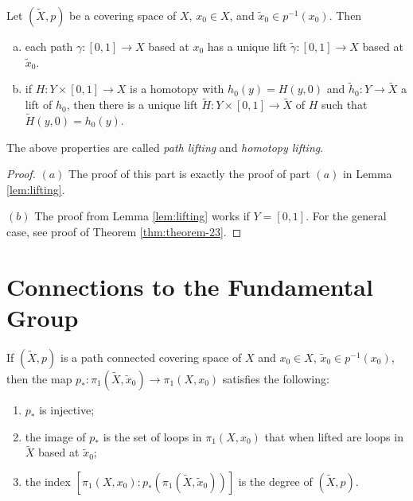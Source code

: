 \begin{lemma}\label{lem:general-lift}
  Let $(\widetilde{X}, p)$ be a covering space of
  $X$, $x_0 \in X$, and $\widetilde{x}_0 \in p^{-1}(x_0)$.
  Then
  \begin{enumerate}[(a)]
    \item each path $\gamma : [0, 1] \to X$ based
      at $x_0$ has a unique lift $\widetilde{\gamma} : [0, 1] \to X$
      based at $\widetilde{x}_0$.
    \item if $H : Y \times [0, 1] \to X$ is a homotopy
      with $h_0(y) = H(y, 0)$ and
      $\widetilde{h}_0 : Y \to \widetilde{X}$ a lift of
      $h_0$, then there is a unique lift
      $\widetilde{H} : Y \times [0, 1] \to \widetilde{X}$
      of $H$ such that $\widetilde{H}(y, 0) = h_0(y)$.
  \end{enumerate}
  The above properties are called \emph{path lifting}
  and \emph{homotopy lifting}.
\end{lemma}

\begin{proof}
  $(a)$ The proof of this part is exactly the proof of
  part $(a)$ in Lemma \ref{lem:lifting}.

  $(b)$ The proof from Lemma \ref{lem:lifting} works
  if $Y = [0, 1]$. For the general case, see proof
  of Theorem \ref{thm:theorem-23}.
\end{proof}

\section{Connections to the Fundamental Group}
\begin{lemma}\label{lem:lemma-21}
  If $(\widetilde{X}, p)$ is a path connected
  covering space of $X$ and $x_0 \in X$,
  $\widetilde{x}_0 \in p^{-1}(x_0)$, then the map
  $p_* : \pi_1(\widetilde{X}, \widetilde{x}_0) \to
  \pi_1(X, x_0)$ satisfies the following:
  \begin{enumerate}
    \item $p_*$ is injective;
    \item the image of $p_*$ is the set of loops
      in $\pi_1(X, x_0)$ that when lifted are
      loops in $\widetilde{X}$ based at $\widetilde{x}_0$;
    \item the index $[\pi_1(X, x_0) : p_*(\pi_1(\widetilde{X}, \widetilde{x}_0))]$ is the degree of $(\widetilde{X}, p)$.
  \end{enumerate}
\end{lemma}

